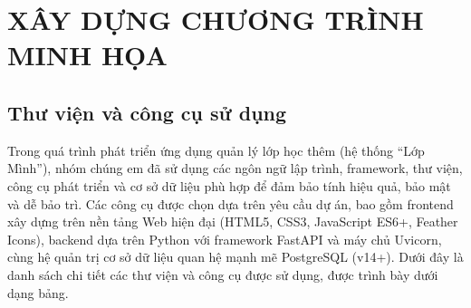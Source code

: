 \documentclass[12pt,a4paper]{report}
\begin{document}
\setcounter{chapter}{4}
\chapter{XÂY DỰNG CHƯƠNG TRÌNH MINH HỌA}

\section{Thư viện và công cụ sử dụng}

Trong quá trình phát triển ứng dụng quản lý lớp học thêm (hệ thống ``Lớp Mình''), nhóm chúng em đã sử dụng các ngôn ngữ lập trình, framework, thư viện, công cụ phát triển và cơ sở dữ liệu phù hợp để đảm bảo tính hiệu quả, bảo mật và dễ bảo trì. Các công cụ được chọn dựa trên yêu cầu dự án, bao gồm frontend xây dựng trên nền tảng Web hiện đại (HTML5, CSS3, JavaScript ES6+, Feather Icons), backend dựa trên Python với framework FastAPI và máy chủ Uvicorn, cùng hệ quản trị cơ sở dữ liệu quan hệ mạnh mẽ PostgreSQL (v14+). Dưới đây là danh sách chi tiết các thư viện và công cụ được sử dụng, được trình bày dưới dạng bảng.
\end{document}
